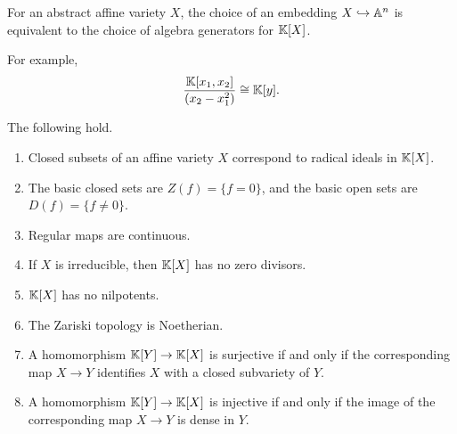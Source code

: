 \begin{remark}
    For an abstract affine variety $X$, the choice of an embedding $X\hookrightarrow \aa^n$ is equivalent to the choice of algebra generators for $\kk[X]$.

    For example,
    \[
        \frac{\kk[x_1,x_2]}{(x_2 - x_1^2)} \cong \kk[y].
    \]
\end{remark}

\begin{lemma*}{
    The following hold.
    \begin{enumerate}[label={(\arabic*)}]
    \item Closed subsets of an affine variety $X$ correspond to radical ideals in $\kk[X]$.
    \item The basic closed sets are $Z(f) = \{f = 0\}$, and the basic open sets are $D(f) = \{f\neq 0\}$.
    \item Regular maps are continuous.
    \item If $X$ is irreducible, then $\kk[X]$ has no zero divisors.
    \item $\kk[X]$ has no nilpotents.
    \item The Zariski topology is Noetherian.
    \item A homomorphism $\kk[Y]\to \kk[X]$ is surjective if and only if the corresponding map $X\to Y$ identifies $X$ with a closed subvariety of $Y$.
    \item A homomorphism $\kk[Y]\to \kk[X]$ is injective if and only if the image of the corresponding map $X\to Y$ is dense in $Y$.
    \end{enumerate}
}
\end{lemma*}

